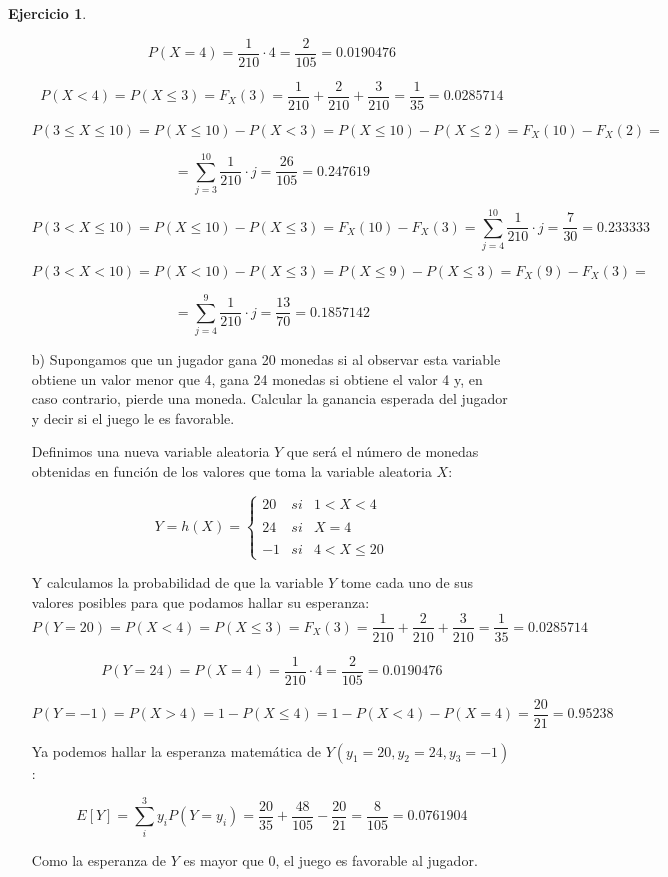 \documentclass[a4paper, 12pt]{article}
\theoremstyle{definition}
\newtheorem{ej}{Ejercicio}
\begin{document}
\begin{ej}
\begin{enumerate}
    \[
    P(X=4) = \frac{1}{210} \cdot 4 = \frac{2}{105} = 0.0190476
    \]
    
    \[
    P(X<4) = P(X\leq 3) = F_{X}(3) = \frac{1}{210} + \frac{2}{210} + \frac{3}{210} = \frac{1}{35} = 0.0285714
    \]
    
    \[
    P(3\leq X \leq 10) = P(X\leq10) - P(X<3) = P(X\leq10) - P(X\leq2) = F_{X}(10)-F_{X}(2)=
    \]
    
    \[
    = \sum_{j=3}^{10} \frac{1}{210} \cdot j = \frac{26}{105} = 0.247619
    \]
    
    \[
    P(3 < X \leq 10) = P(X\leq10) - P(X \leq 3) = F_{X}(10)-F_{X}(3)= \sum_{j=4}^{10} \frac{1}{210} \cdot j = \frac{7}{30} = 0.233333
    \]
    
     \[
    P(3 < X < 10) = P(X<10) - P(X\leq3) = P(X\leq9) - P(X\leq3) = F_{X}(9)-F_{X}(3)=
    \]
    
    \[
    = \sum_{j=4}^{9} \frac{1}{210} \cdot j = \frac{13}{70} = 0.1857142
    \]
    
    \item[b)] Supongamos que un jugador gana 20 monedas si al observar esta variable obtiene un valor
    menor que 4, gana 24 monedas si obtiene el valor 4 y, en caso contrario, pierde una moneda.
    Calcular la ganancia esperada del jugador y decir si el juego le es favorable.
    
    Definimos una nueva variable aleatoria $Y$ que será el número de monedas obtenidas en función de los valores que toma la variable aleatoria $X$:
    
    \[
    Y= h(X) = \left\{ \begin{array}{lcc}
             20 &   si  & 1 < X < 4 \\
             \\ 24 &  si & X = 4 \\
             \\ -1 &  si  & 4 < X \leq 20
             \end{array}
   \right.
    \]
    
    Y calculamos la probabilidad de que la variable $Y$ tome cada uno de sus valores posibles para que podamos hallar su esperanza:
    \[
    P(Y=20)=P(X<4)=P(X\leq3)=F_{X}(3) = \frac{1}{210} + \frac{2}{210} + \frac{3}{210} = \frac{1}{35} = 0.0285714
    \]
    
    \[
    P(Y=24)=P(X=4)= \frac{1}{210} \cdot 4 = \frac{2}{105} = 0.0190476
    \]
    
    \[
    P(Y=-1)=P(X>4)=1-P(X \leq 4) = 1-P(X<4)-P(X=4)= \frac{20}{21} = 0.95238
    \]
    
    Ya podemos hallar la esperanza matemática de $Y (y_{1} = 20, y_{2} = 24, y_{3} = -1)$ :
    
    \[
    E[Y]=\sum_{i}^3 y_{i}P(Y=y_{i})=\frac{20}{35}+\frac{48}{105}-\frac{20}{21} = \frac{8}{105} = 0.0761904
    \]
    
    Como la esperanza de $Y$ es mayor que 0, el juego es favorable al jugador.
\end{enumerate}
\end{ej}
\end{document}
